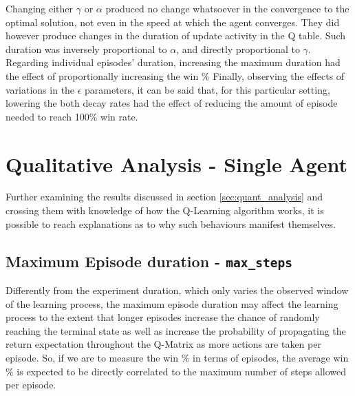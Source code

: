 \documentclass[10pt]{article}
\begin{document}
    Changing either $\gamma$ or $\alpha$ produced no change whatsoever in the convergence to the optimal solution, not even in the speed at which the agent converges. They did however produce changes in the duration of update activity in the Q table. Such duration was inversely proportional to $\alpha$, and directly proportional to $\gamma$.
    Regarding individual episodes' duration, increasing the maximum duration had the effect of proportionally increasing the win \%
    Finally, observing the effects of variations in the $\epsilon$ parameters, it can be said that, for this particular setting, lowering the both decay rates had the effect of reducing the amount of episode needed to reach 100\% win rate.

\section{Qualitative Analysis - Single Agent}
    Further examining the results discussed in section \ref{sec:quant_analysis} and crossing them with knowledge of how the Q-Learning algorithm works, it is possible to reach explanations as to why such behaviours manifest themselves.

    \subsection{Maximum Episode duration - \texttt{max\_steps}}
        Differently from the experiment duration, which only varies the observed window of the learning process, the maximum episode duration may affect the learning process to the extent that longer episodes increase the chance of randomly reaching the terminal state as well as increase the probability of propagating the return expectation throughout the Q-Matrix as more actions are taken per episode. So, if we are to measure the win \% in terms of episodes, the average win \% is expected to be directly correlated to the maximum number of steps allowed per episode.
\end{document}
